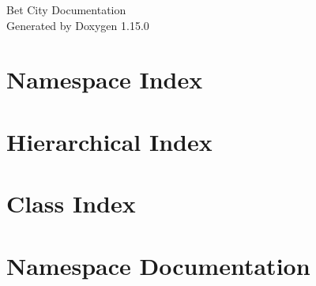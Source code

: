 \documentclass[twoside]{book}
\newcommand{\+}{\discretionary{\mbox{\scriptsize$\hookleftarrow$}}{}{}}
\newcommand{\clearemptydoublepage}{%
    \newpage{\pagestyle{empty}\cleardoublepage}%
  }
\begin{document}
  \raggedbottom
    \hypersetup{pageanchor=false,
                bookmarksnumbered=true,
                pdfencoding=unicode
               }
  \begin{titlepage}
  \vspace*{7cm}
  \begin{center}%
  {\Large Bet City Documentation}\\
  \vspace*{1cm}
  {\large Generated by Doxygen 1.15.0}\\
  \end{center}
  \end{titlepage}
  \clearemptydoublepage
  \tableofcontents
  \clearemptydoublepage
  \hypersetup{pageanchor=true}
\chapter{Namespace Index}

\chapter{Hierarchical Index}

\chapter{Class Index}

\chapter{Namespace Documentation}




\end{document}
